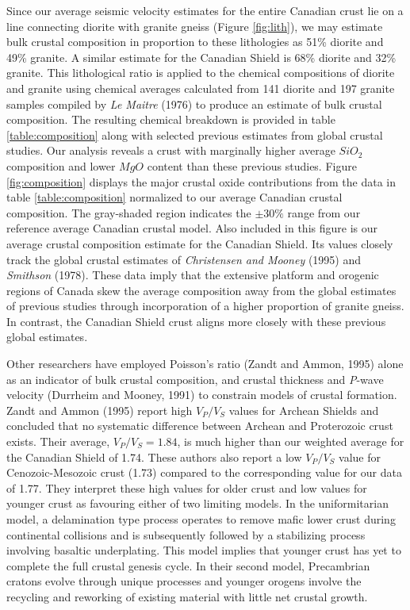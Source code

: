 \documentclass[review]{elsarticle}
\begin{document}
Since our average seismic velocity estimates for the entire Canadian crust lie on a line connecting diorite with granite gneiss (Figure \ref{fig:lith}), we may estimate bulk crustal composition in proportion to these lithologies as 51\% diorite and 49\% granite. A similar estimate for the Canadian Shield is 68\% diorite and 32\% granite. This lithological ratio is applied to the chemical compositions of diorite and granite using chemical averages calculated from 141 diorite and 197 granite samples compiled by {\it Le Maitre} (1976) to produce an estimate of bulk crustal composition. The resulting chemical breakdown is provided in table \ref{table:composition} along with selected previous estimates from global crustal studies. Our analysis reveals a crust with marginally higher average $SiO_2$ composition and lower $MgO$ content than these previous studies. Figure \ref{fig:composition} displays the major crustal oxide contributions from the data in table \ref{table:composition} normalized to our average Canadian crustal composition. The gray-shaded region indicates the $\pm 30\%$ range from our reference average Canadian crustal model.  Also included in this figure is our average crustal composition estimate for the Canadian Shield. Its values closely track the global crustal estimates of {\it Christensen and Mooney} (1995) and {\it Smithson} (1978). These data imply that the extensive platform and orogenic regions of Canada skew the average composition away from the global estimates of previous studies through incorporation of a higher proportion of granite gneiss. In contrast, the Canadian Shield crust aligns more closely with these previous global estimates.

Other researchers have employed Poisson's ratio (Zandt and Ammon, 1995) alone as an indicator of bulk crustal composition, and crustal thickness and {\it P}-wave velocity (Durrheim and Mooney, 1991) to constrain models of crustal formation. Zandt and Ammon (1995) report high $V_P/V_S$ values for Archean Shields and concluded that no systematic difference between Archean and Proterozoic crust exists. Their average, $V_P/V_S=1.84$, is much higher than our weighted average for the Canadian Shield of 1.74. These authors also report a low $V_P/V_S$ value for Cenozoic-Mesozoic crust (1.73) compared to the corresponding value for our data of 1.77. They interpret these high values for older crust and low values for younger crust as favouring either of two limiting models. In the uniformitarian model, a delamination type process operates to remove mafic lower crust during continental collisions and is subsequently followed by a stabilizing process involving basaltic underplating. This model implies that younger crust has yet to complete the full crustal genesis cycle. In their second model, Precambrian cratons evolve through unique processes and younger orogens involve the recycling and reworking of existing material with little net crustal growth.
\end{document}
